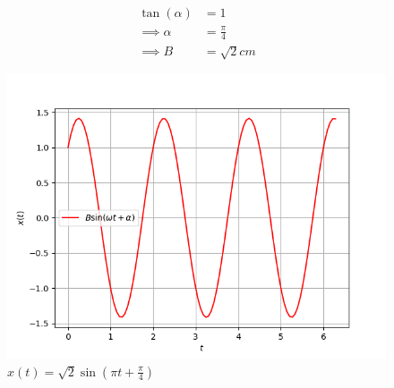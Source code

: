 \documentclass[journal,12pt,twocolumn]{IEEEtran}
\theoremstyle{remark}
\begin{document}
\begin{enumerate}
\begin{align}
    \tan(\alpha)& = 1\\
\implies
\alpha &= \frac{\pi}{4} \\
\implies 
B &=\sqrt{2}cm
\end{align}
\begin{figure}[h]
\renewcommand\thefigure{2}
    \centering
    \includegraphics[width=0.8\columnwidth]{figs/fig2.png}
    \caption{$x(t) = \sqrt{2}\sin(\pi t + \frac{\pi}{4})$}
    \label{Fig2}
\end{figure}
\end{enumerate}
\end{document}
